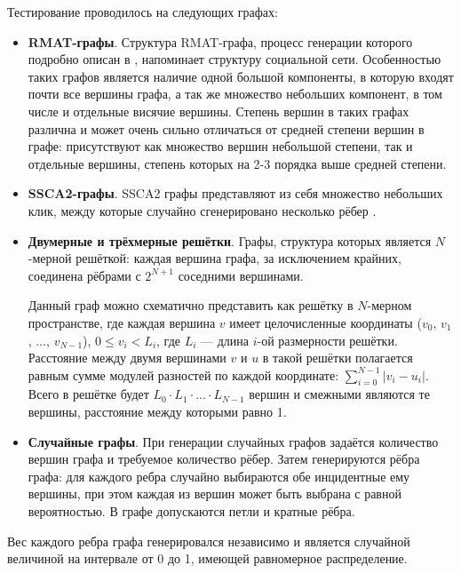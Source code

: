 \documentclass[a4paper,10pt]{extarticle}
\begin{document}
Тестирование проводилось на следующих графах:
\begin{itemize}
    \item \textbf{RMAT-графы}. Структура RMAT-графа, процесс генерации которого подробно описан в \cite{rmat-graph}, напоминает структуру социальной сети. Особенностью таких графов является наличие одной большой компоненты, в которую входят почти все вершины графа, а так же множество небольших компонент, в том числе и отдельные висячие вершины. Степень вершин в таких графах различна и может очень сильно отличаться от средней степени вершин в графе: присутствуют как множество вершин небольшой степени, так и отдельные вершины, степень которых на 2-3 порядка выше средней степени.
    
    \item \textbf{SSCA2-графы}. SSCA2 графы представляют из себя множество небольших клик, между которые случайно сгенерировано несколько рёбер \cite{ssca2-graph}.
    
    \item \textbf{Двумерные и трёхмерные решётки}. Графы, структура которых является $N$-мерной решёткой: каждая вершина графа, за исключением крайних, соединена рёбрами с $2^{N+1}$ соседними вершинами.
    
    Данный граф можно схематично представить как решётку в $N$-мерном пространстве, где каждая вершина $v$ имеет целочисленные координаты ($v_0$, $v_1$, $\ldots$, $v_{N-1}$), $0 \leq v_i < L_i$, где $L_i$ --- длина $i$-ой размерности решётки. Расстояние между двумя вершинами $v$ и $u$ в такой решётки полагается равным сумме модулей разностей по каждой координате: $\displaystyle \sum_{i=0}^{N-1} |v_i - u_i|$. 
    Всего в решётке будет $L_0 \cdot L_1 \cdot \ldots \cdot L_{N-1}$ вершин и смежными являются те вершины, расстояние между которыми равно 1.
    
    \item \textbf{Случайные графы}. 
        При генерации случайных графов задаётся количество вершин графа и требуемое количество рёбер. Затем генерируются рёбра графа: для каждого ребра случайно выбираются обе инцидентные ему вершины, при этом каждая из вершин может быть выбрана с равной вероятностью. В графе допускаются петли и кратные рёбра.
\end{itemize}
Вес каждого ребра графа генерировался независимо и является случайной величиной на интервале от 0 до 1, имеющей равномерное распределение.
\end{document}
